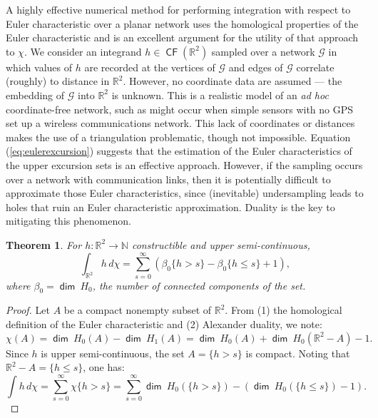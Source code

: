 \documentclass{psapm-l}
\newtheorem{theorem}{Theorem}[section]
\theoremstyle{definition}
\theoremstyle{remark}
\numberwithin{equation}{section}
\begin{document}
A highly effective numerical method for performing integration with respect to Euler characteristic over a planar network uses the homological properties of the Euler characteristic and is an excellent argument for the utility of that approach to $\chi$. We consider an integrand $h\in{{{\operatorname{\mathsf{{CF}}}}}}({{\mathbb R}}^2)$ sampled over a network ${{\mathcal G}}$ in which values of $h$ are recorded at the vertices of ${{\mathcal G}}$ and edges of ${{\mathcal G}}$ correlate (roughly) to distance in ${{\mathbb R}}^2$. However, no coordinate data are assumed --- the embedding of ${{\mathcal G}}$ into ${{\mathbb R}}^2$ is unknown. This is a realistic model of an {\em ad hoc} coordinate-free network, such as might occur when simple sensors with no GPS set up a wireless communications network. This lack of coordinates or distances makes the use of a triangulation problematic, though not impossible.
Equation (\ref{eq:eulerexcursion}) suggests that the estimation of the Euler characteristics of the upper excursion sets is an effective approach. However, if the sampling occurs over a network with communication links, then it is potentially difficult to approximate those Euler characteristics, since (inevitable) undersampling leads to holes that ruin an Euler characteristic approximation. Duality is the key to mitigating this phenomenon.

\begin{theorem}
\label{thm:planardual}
For $h\colon{{\mathbb R}}^2\to{{\mathbb N}}$ constructible and upper semi-continuous,
\begin{equation}
\label{eq:dual2d}
    \int_{{{\mathbb R}}^2}h\,d\chi
    =
    \sum_{s=0}^\infty
    \left(\beta_0\{h>s\} - \beta_0\{h\leq s\} + 1\right)
,
\end{equation}
where $\beta_0={{{\operatorname{\mathsf{{dim}}}}}}\ H_0$, the number of connected components of the set.
\end{theorem}
\begin{proof}
Let $A$ be a compact nonempty subset of ${{\mathbb R}}^2$. From (1) the homological definition of the Euler characteristic and (2) Alexander duality, we note:
\[
    \chi(A) = {{{\operatorname{\mathsf{{dim}}}}}}\ H_0(A) - {{{\operatorname{\mathsf{{dim}}}}}}\ H_1(A) = {{{\operatorname{\mathsf{{dim}}}}}}\ H_0(A) + {{{\operatorname{\mathsf{{dim}}}}}}\ H_0({{\mathbb R}}^2-A)-1 .
\]
Since $h$ is upper semi-continuous, the set $A=\{h>s\}$ is compact. Noting that ${{\mathbb R}}^2-A=\{h\leq s\}$, one has:
\[
    \int h\,d\chi
    = \sum_{s=0}^\infty \chi\{h>s\}
    = \sum_{s=0}^\infty {{{\operatorname{\mathsf{{dim}}}}}}\ H_0(\{h>s\})-\left({{{\operatorname{\mathsf{{dim}}}}}}\ H_0(\{h\leq s\})-1\right) .
\]
\end{proof}
\end{document}
